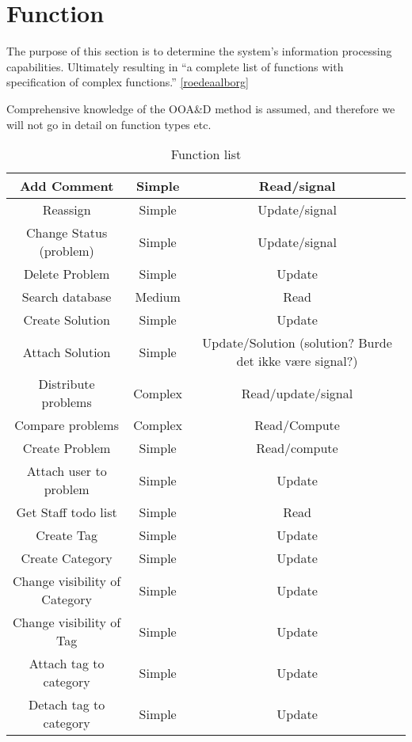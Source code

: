 \section{Function}
The purpose of this section is to determine the system's information processing capabilities. Ultimately resulting in ``a complete list of functions with specification of complex functions.'' 
\ref{roedeaalborg}

Comprehensive knowledge of the OOA\&D method is assumed, and therefore we will not go in detail on function types etc. 

\begin{table}[htdp]
\caption{Function list}
\begin{center}
\begin{tabular}{|c|c|c|}
\hline
Add Comment &   Simple & Read/signal   \\ \hline%
Reassign & Simple   & Update/signal \\ \hline%
Change Status (problem) &   Simple & Update/signal \\ \hline%
Delete Problem & Simple &   Update \\   \hline%
Search database & Medium &   Read \\ \hline%
Create Solution & Simple &   Update \\   \hline%
Attach Solution & Simple &   Update/Solution (solution? Burde det ikke v\ae re signal?) \\   \hline%
Distribute problems &   Complex & Read/update/signal \\   \hline%
Compare problems & Complex & Read/Compute \\ \hline%
Create Problem &   Simple & Read/compute \\   \hline%
Attach user to problem & Simple & Update \\ \hline%
Get Staff todo list & Simple & Read \\   \hline%
Create Tag & Simple &   Update \\ \hline%
Create Category & Simple & Update \\ \hline%
Change visibility of Category &   Simple &   Update \\   \hline%
Change visibility of Tag &   Simple &  Update \\ \hline%
Attach tag to category & Simple & Update \\ \hline%
Detach tag to category & Simple & Update \\ \hline%

\end{tabular}
\end{center}
\end{table}
